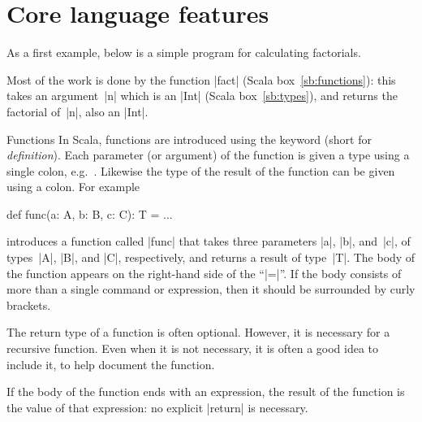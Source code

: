 \section{Core language features}
\label{sec:scala-core}

As a first example, below is a simple program for
calculating factorials. 
%


Most of the work is done by the function |fact| (Scala
box~\ref{sb:functions}): this takes an argument~|n| which is an |Int| (Scala
box~\ref{sb:types}), and returns the factorial of~|n|, also an |Int|.



\begin{scalaBox}{Functions}
\label{sb:functions}
In Scala, functions are introduced using the keyword  (short for
\emph{definition}).  Each parameter (or argument) of the function is given a
type using a single colon, e.g.~.  Likewise the type of the result
of the function can be given using a colon.  For example
\begin{scala}
  def func(a: A, b: B, c: C): T = ...
\end{scala}
introduces a function called |func| that takes three parameters |a|, |b|,
and~|c|, of types~|A|, |B|, and |C|, respectively, and returns a result of
type~|T|.  The body of the function appears on the right-hand side of the
``|=|''.  If the body consists of more than a single command or expression,
then it should be surrounded by curly brackets.

The return type of a function is often optional.  However, it is necessary for
a recursive function.  Even when it is not necessary, it is often a good idea
to include it, to help document the function.

If the body of the function ends with an expression, the result of the
function is the value of that expression: no explicit |return| is necessary.
\end{scalaBox}

